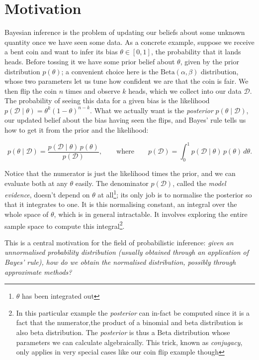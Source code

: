 \section{Motivation}%
\label{sec:future-motivation}
Bayesian inference is the problem of updating our beliefs about some unknown quantity once we have seen some data. As a concrete example, suppose we receive a bent coin
and want to infer its bias $\theta \in [0,1]$, the probability that it lands heads. Before tossing it we have some prior belief about $\theta$, given by the prior
distribution $p(\theta)$; a convenient choice here is the $\mathrm{Beta}(\alpha, \beta)$ distribution, whose two parameters let us tune how confident we are that the
coin is fair. We then flip the coin $n$ times and observe $k$ heads, which we collect into our data $\mathcal{D}$. The probability of seeing this data for a given bias
is the likelihood $p(\mathcal{D} \mid \theta) = \theta^k (1 - \theta)^{n - k}$. What we actually want is the \emph{posterior} $p(\theta \mid \mathcal{D})$, our updated
belief about the bias having seen the flips, and Bayes' rule tells us how to get it from the prior and the likelihood:

\[
p(\theta \mid \mathcal{D}) = \frac{p(\mathcal{D} \mid \theta)\, p(\theta)}{p(\mathcal{D})}, \qquad \text{where} \qquad p(\mathcal{D}) = \int_0^1 p(\mathcal{D} \mid \theta)\, p(\theta)\, d\theta.
\]

Notice that the numerator is just the likelihood times the prior, and we can evaluate both at any $\theta$ easily. The denominator $p(\mathcal{D})$, called the
\emph{model evidence}, doesn't depend on $\theta$ at all\footnote{$\theta$ has been integrated out}; its only job is to normalise the posterior so that it integrates to one.
It is this normalising constant, an integral over the whole space of $\theta$, which is in general intractable. It involves exploring the entire sample space to compute this
integral\footnote{In this particular example the \emph{posterior} can in-fact be computed since it is a fact that the numerator,the product of a binomial and beta distribution is also beta distribution.
The \emph{posterior} is thus a $\mathrm{Beta}$ distribution whose parameters we can calculate algebraically. This trick, known as \emph{conjugacy}, only applies in very special cases like our coin flip example though}.

This is a central motivation for the field of probabilistic inference: \emph{given an unnormalised probability distribution (usually obtained through an application of Bayes' rule), how do we
obtain the normalised distribution, possibly through approximate methods?}

